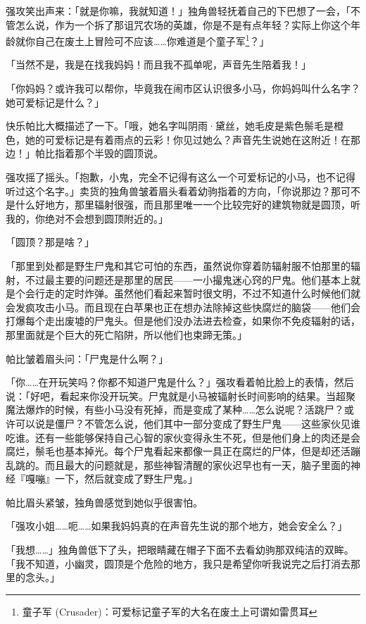 强攻笑出声来：「就是你嘛，我就知道！」独角兽轻抚着自己的下巴想了一会，「不管怎么说，作为一个拆了那诅咒农场的英雄，你是不是有点年轻？实际上你这个年龄就你自己在废土上冒险可不应该……你难道是个童子军\footnote{童子军 (Crusader)：可爱标记童子军的大名在废土上可谓如雷贯耳}？」

「当然不是，我是在找我妈妈！而且我不孤单呢，声音先生陪着我！」

「你妈妈？或许我可以帮你，毕竟我在闹市区认识很多小马，你妈妈叫什么名字？她可爱标记是什么？」

快乐帕比大概描述了一下。「哦，她名字叫阴雨·黛丝，她毛皮是紫色鬃毛是橙色，她的可爱标记是有着雨点的云彩！你见过她么？声音先生说她在这附近！在那边！」帕比指着那个半毁的圆顶说。

强攻摇了摇头。「抱歉，小鬼，完全不记得有这么一个可爱标记的小马，也不记得听过这个名字。」卖货的独角兽皱着眉头看着幼驹指着的方向，「你说那边？那可不是什么好地方，那里辐射很强，而且那里唯一一个比较完好的建筑物就是圆顶，听我的，你绝对不会想到圆顶附近的。」

「圆顶？那是啥？」

「那里到处都是野生尸鬼和其它可怕的东西，虽然说你穿着防辐射服不怕那里的辐射，不过最主要的问题还是那里的居民——一小撮鬼迷心窍的尸鬼。他们基本上就是个会行走的定时炸弹。虽然他们看起来暂时很文明，不过不知道什么时候他们就会发疯攻击小马。而且现在白苹果也正在想办法除掉这些快腐烂的脑袋——他们会打爆每个走出废墟的尸鬼头。但是他们没办法进去检查，如果你不免疫辐射的话，那里面就是个巨大的死亡陷阱，所以他们也束蹄无策。」

帕比皱着眉头问：「尸鬼是什么啊？」

「你……在开玩笑吗？你都不知道尸鬼是什么？」强攻看着帕比脸上的表情，然后说：「好吧，看起来你没开玩笑。尸鬼就是小马被辐射长时间影响的结果。当超聚魔法爆炸的时候，有些小马没有死掉，而是变成了某种……怎么说呢？活跳尸？或许可以说是僵尸？不管怎么说，他们其中一部分变成了野生尸鬼——这些家伙见谁吃谁。还有一些能够保持自己心智的家伙变得永生不死，但是他们身上的肉还是会腐烂，鬃毛也基本掉光。每个尸鬼看起来都像一具正在腐烂的尸体，但是却还活蹦乱跳的。而且最大的问题就是，那些神智清醒的家伙迟早也有一天，脑子里面的神经『嘎嘣』一下，然后就变成了野生尸鬼。」

帕比眉头紧皱，独角兽感觉到她似乎很害怕。

「强攻小姐……呃……如果我妈妈真的在声音先生说的那个地方，她会安全么？」

「我想……」独角兽低下了头，把眼睛藏在帽子下面不去看幼驹那双纯洁的双眸。「我不知道，小幽灵，圆顶是个危险的地方，我只是希望你听我说完之后打消去那里的念头。」

